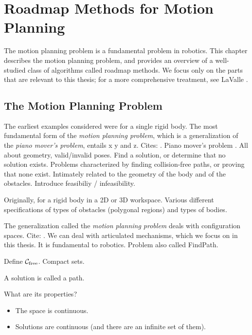 \chapter{Roadmap Methods for Motion Planning}
\label{chap:roadmaps}

The motion planning problem is a fundamental problem in robotics.
This chapter describes the motion planning problem,
and provides an overview of a well-studied class of algorithms called
roadmap methods.
We focus only on the parts that are relevant to this thesis;
for a more comprehensive treatment,
see LaValle \citep{lavalle2006planningbook}.

\section{The Motion Planning Problem}

The earliest examples considered were for a single rigid body.
The most fundamental form of the \emph{motion planning problem},
which is a generalization of the \emph{piano mover's problem},
entails x y and z.
Cites:
\citep{lozanoperezwedley1979collisionfree}.
Piano mover's problem
\citep{schwartzsharir1983pianomovers1}.
All about geometry, valid/invalid poses.
Find a solution, or determine that no solution exists.
Problems characterized by finding collision-free paths,
or proving that none exist.
Intimately related to the geometry of the body and of the obstacles.
Introduce feasibiliy / infeasibility.

Originally, for a rigid body
in a 2D or 3D workspace.
Various different specifications of types of obstacles (polygonal regions)
and types of bodies.

The generalization called the \emph{motion planning problem}
deals with configuration spaces.
Cite: \citep{lozanoperez1983cspace}.
We can deal with articulated mechanisms,
which we focus on in this thesis.
It is fundamental to robotics.
Problem also called FindPath.

Define $\mathcal{C}_{\mbox{\scriptsize free}}$.
Compact sets.

A solution is called a path.

What are its properties?

\begin{itemize}
\item The space is continuous.
\item Solutions are continuous (and there are an infinite set of them).
\end{itemize}

